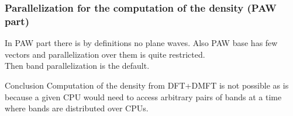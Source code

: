 \begin{frame}
  \frametitle{Parallelization for the computation of the density (PAW part)}
  In PAW part there is by definitions no plane waves. Also PAW base has few vectors
  and parallelization over them is quite restricted.\\
  Then band parallelization is the default.
\end{frame}

\begin{frame}
  \begin{block}{Conclusion}
    Computation of the density from DFT+DMFT is not possible as is because a given
    CPU would need to access arbitrary pairs of bands at a time where bands are
    distributed over CPUs.
  \end{block}
\end{frame}
